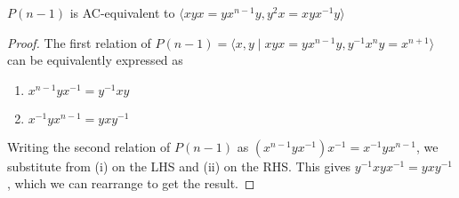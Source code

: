 \begin{lemma}
    $P(n-1)$ is AC-equivalent to $\langle xyx=yx^{n-1}y, y^2x=xyx^{-1}y \rangle$
\end{lemma}

\begin{proof}
    The first relation of $P(n-1)=\langle x,y \mid xyx=yx^{n-1} y, y^{-1}x^n y = x^{n+1}\rangle$ can be equivalently expressed as 
    \begin{enumerate}[label=(\roman*)]
        \item $x^{n-1}yx^{-1}=y^{-1}xy$
        \item $x^{-1}yx^{n-1}=yxy^{-1}$
    \end{enumerate}
    Writing the second relation of $P(n-1)$ as  $(x^{n-1}yx^{-1})x^{-1}=x^{-1}yx^{n-1}$, we substitute from (i) on the LHS and (ii) on the RHS. This gives $y^{-1}xyx^{-1}=yxy^{-1}$, which we can rearrange to get the result.
\end{proof}

